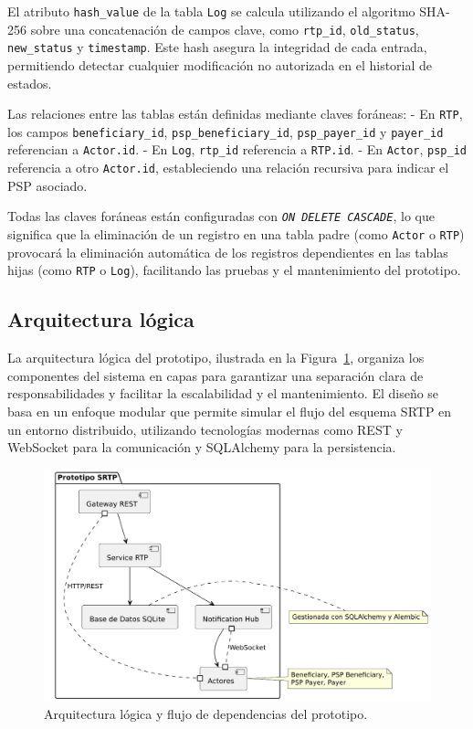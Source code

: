El atributo \texttt{hash\_value} de la tabla \texttt{Log} se calcula utilizando el algoritmo SHA-256 sobre una concatenación de campos clave, como \texttt{rtp\_id}, \texttt{old\_status}, \texttt{new\_status} y \texttt{timestamp}. Este hash asegura la integridad de cada entrada, permitiendo detectar cualquier modificación no autorizada en el historial de estados.

Las relaciones entre las tablas están definidas mediante claves foráneas:
- En \texttt{RTP}, los campos \texttt{beneficiary\_id}, \texttt{psp\_beneficiary\_id}, \texttt{psp\_payer\_id} y \texttt{payer\_id} referencian a \texttt{Actor.id}.
- En \texttt{Log}, \texttt{rtp\_id} referencia a \texttt{RTP.id}.
- En \texttt{Actor}, \texttt{psp\_id} referencia a otro \texttt{Actor.id}, estableciendo una relación recursiva para indicar el PSP asociado.

Todas las claves foráneas están configuradas con \emph{\texttt{ON DELETE CASCADE}}, lo que significa que la eliminación de un registro en una tabla padre (como \texttt{Actor} o \texttt{RTP}) provocará la eliminación automática de los registros dependientes en las tablas hijas (como \texttt{RTP} o \texttt{Log}), facilitando las pruebas y el mantenimiento del prototipo.


\subsection{Arquitectura lógica}
\label{subsec:diseno_arquitectura}

La arquitectura lógica del prototipo, ilustrada en la Figura~\ref{fig:componentes}, organiza los componentes del sistema en capas para garantizar una separación clara de responsabilidades y facilitar la escalabilidad y el mantenimiento. El diseño se basa en un enfoque modular que permite simular el flujo del esquema SRTP en un entorno distribuido, utilizando tecnologías modernas como REST y WebSocket para la comunicación y SQLAlchemy para la persistencia.

\begin{figure}[htbp]
  \centering
  \includegraphics[width=.85\textwidth]{Imagenes/DiagComp.pdf}
  \caption{Arquitectura lógica y flujo de dependencias del prototipo.}
  \label{fig:componentes}
\end{figure}


